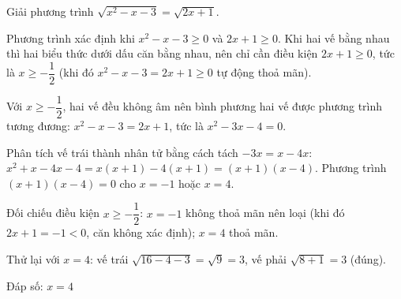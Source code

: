 \begin{problem}[9DS-CAN-016]
Giải phương trình $\sqrt{x^2 - x - 3} = \sqrt{2x + 1}$.

\begin{solution}
Phương trình xác định khi $x^2 - x - 3 \geq 0$ và $2x + 1 \geq 0$. Khi hai vế bằng nhau thì hai biểu thức dưới dấu căn bằng nhau, nên chỉ cần điều kiện $2x + 1 \geq 0$, tức là $x \geq -\dfrac{1}{2}$ (khi đó $x^2 - x - 3 = 2x + 1 \geq 0$ tự động thoả mãn).

Với $x \geq -\dfrac{1}{2}$, hai vế đều không âm nên bình phương hai vế được phương trình tương đương: $x^2 - x - 3 = 2x + 1$, tức là $x^2 - 3x - 4 = 0$.

Phân tích vế trái thành nhân tử bằng cách tách $-3x = x - 4x$: $x^2 + x - 4x - 4 = x(x + 1) - 4(x + 1) = (x + 1)(x - 4)$. Phương trình $(x + 1)(x - 4) = 0$ cho $x = -1$ hoặc $x = 4$.

Đối chiếu điều kiện $x \geq -\dfrac{1}{2}$: $x = -1$ không thoả mãn nên loại (khi đó $2x + 1 = -1 < 0$, căn không xác định); $x = 4$ thoả mãn.

Thử lại với $x = 4$: vế trái $\sqrt{16 - 4 - 3} = \sqrt{9} = 3$, vế phải $\sqrt{8 + 1} = 3$ (đúng).

Đáp số: $\boxed{x = 4}$
\end{solution}
\end{problem}


